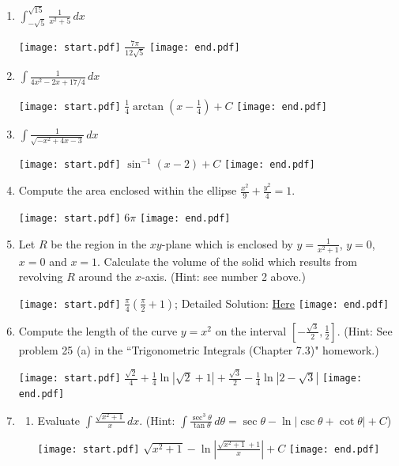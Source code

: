 \documentclass[12pt]{article}
\begin{document}
\begin{enumerate}
\item $\int_{-\sqrt{5}}^{\sqrt{15}} \frac{1}{x^2+5}\,dx$ 

\texttt{[image: start.pdf]}
{{$\frac{7\pi}{12\sqrt{5}}$}}
\texttt{[image: end.pdf]}


\item $\int \frac{1}{4x^2-2x+17/4}\,dx$ 

\texttt{[image: start.pdf]}
{{$\frac{1}{4}\arctan{\left(x-\frac{1}{4}\right)}+C$}}
\texttt{[image: end.pdf]}


\item $\int \frac{1}{\sqrt{-x^2+4x-3}} \,dx$

\texttt{[image: start.pdf]}
{{$\sin^{-1}(x-2)+C$}}
\texttt{[image: end.pdf]}


\item Compute the area enclosed within the ellipse $\frac{x^2}{9}+\frac{y^2}{4}=1$.

\texttt{[image: start.pdf]}
{{$6\pi$}}
\texttt{[image: end.pdf]}


\item Let $R$ be the region in the $xy$-plane which is enclosed by $y=\frac{1}{x^2+1}$, $y=0$, $x=0$ and $x=1$.  Calculate the volume of the solid which results from revolving $R$ around the $x$-axis.  (Hint: see number 2 above.)

\texttt{[image: start.pdf]}
{{$\frac{\pi}{4}\left(\frac{\pi}{2}+1\right)$; Detailed Solution: \textcolor{blue}{\href{http://www.math.drexel.edu/classes/Calculus/resources/Math122HW/Solutions/122_16_Trig_Sub_14.pdf}{Here}}}}
\texttt{[image: end.pdf]}


\item Compute the length of the curve $y=x^2$ on the interval $\left[-\frac{\sqrt{3}}{2},\frac{1}{2}\right]$.  (Hint: See problem 25 (a) in the ``Trigonometric Integrals (Chapter 7.3)" homework.)

\texttt{[image: start.pdf]}
{{$\frac{\sqrt{2}}{4}+\frac{1}{4}\ln{\left|\sqrt{2}+1\right|}+\frac{\sqrt{3}}{2}-\frac{1}{4}\ln{\left|2-\sqrt{3}\right|}$}}
\texttt{[image: end.pdf]}


\item \begin{enumerate}

\item Evaluate $\int \frac{\sqrt{x^2+1}}{x} \,dx$.  (Hint: $\int \frac{\sec^3{\theta}}{\tan{\theta}} \,d\theta = \sec{\theta}-\ln{|\csc{\theta}+\cot{\theta}|}+C$)

\texttt{[image: start.pdf]}
{{$\sqrt{x^2+1}-\ln{\left|\frac{\sqrt{x^2+1}+1}{x}\right|}+C$}}
\texttt{[image: end.pdf]}



\end{enumerate}
\end{enumerate}
\end{document}
